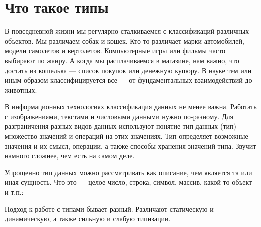 \documentclass[book.tex]{subfiles}
\begin{document}



\maketitle 

\section*{Что такое типы}

В повседневной жизни мы регулярно сталкиваемся с классификаций различных объектов. Мы различаем собак и кошек. Кто-то различает марки автомобилей, модели самолетов и вертолетов. Компьютерные игры или фильмы часто выбирают по жанру. А когда мы расплачиваемся в магазине, нам важно, что достать из кошелька --- список покупок или денежную купюру. В науке тем или иным образом классифицируется все --- от фундаментальных взаимодействий до животных.

В информационных технологиях классификация данных не менее важна. Работать с изображениями, текстами и числовыми данными нужно по-разному. Для разграничения разных видов данных используют понятие тип данных (тип) --- множество значений и операций на этих значениях. Тип определяет возможные значения и их смысл, операции, а также способы хранения значений типа. Звучит намного сложнее, чем есть на самом деле.

Упрощенно тип данных можно рассматривать как описание, чем является та или иная сущность. Что это --- целое число, строка, символ, массив, какой-то объект и т.п.:


Подход к работе с типами бывает разный. Различают статическую и динамическую, а также сильную и слабую типизации.

\end{document}
